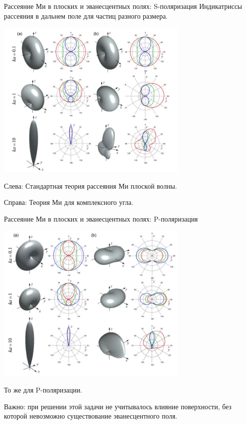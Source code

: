\documentclass[9pt, compress, xcolor=table]{beamer}
\begin{document}
\begin{frame}{Рассеяние Ми в плоских и эванесцентных полях: S-поляризация}
Индикатриссы рассеяния в дальнем поле для частиц разного размера.
\begin{center}
\includegraphics[width=0.7\textwidth]{mie1}
\end{center}

Слева: Стандартная теория рассеяния Ми плоской волны.

Справа: Теория Ми для комплексного угла.
\end{frame}

\begin{frame}{Рассеяние Ми в плоских и эванесцентных полях: P-поляризация}

\begin{center}
\includegraphics[width=0.7\textwidth]{mie2}
\end{center}
 То же для P-поляризации.

\textcolor{red!50!black}{Важно:} при решении этой задачи не учитывалось влияние поверхности, без которой невозможно существование эванесцентного поля.
\end{frame}
\end{document}
